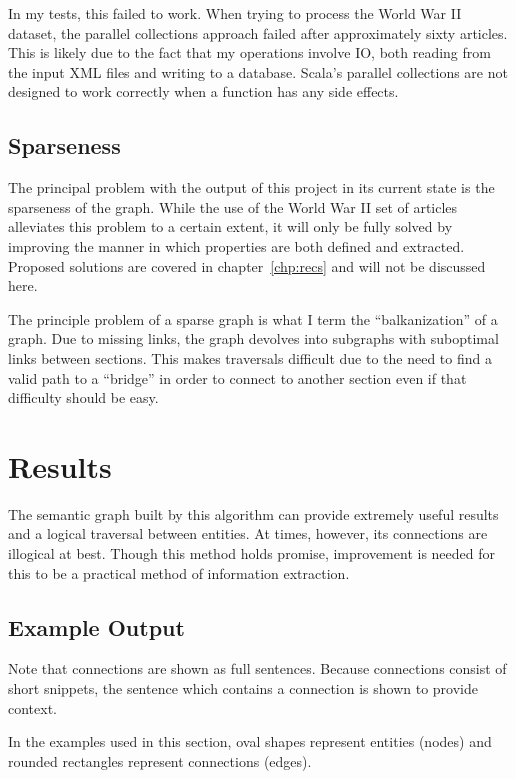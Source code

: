 In my tests, this failed to work.  When trying to process the World War II dataset, the parallel collections approach failed after approximately sixty articles.  This is likely due to the fact that my operations involve IO, both reading from the input XML files and writing to a database.  Scala's parallel collections are not designed to work correctly when a function has any side effects.

\section{Sparseness}

The principal problem with the output of this project in its current state is the sparseness of the graph.  While the use of the World War II set of articles alleviates this problem to a certain extent, it will only be fully solved by improving the manner in which properties are both defined and extracted.  Proposed solutions are covered in chapter~\ref{chp:recs} and will not be discussed here.

The principle problem of a sparse graph is what I term the ``balkanization'' of a graph.  Due to missing links, the graph devolves into subgraphs with suboptimal links between sections.  This makes traversals difficult due to the need to find a valid path to a ``bridge'' in order to connect to another section even if that difficulty should be easy.  


\chapter{Results}

The semantic graph built by this algorithm can provide extremely useful results and a logical traversal between entities.  At times, however, its connections are illogical at best.  Though this method holds promise, improvement is needed for this to be a practical method of information extraction.

\section{Example Output}

Note that connections are shown as full sentences.  Because connections consist of short snippets, the sentence which contains a connection is shown to provide context.  

In the examples used in this section, oval shapes represent entities (nodes) and rounded rectangles represent connections (edges).

